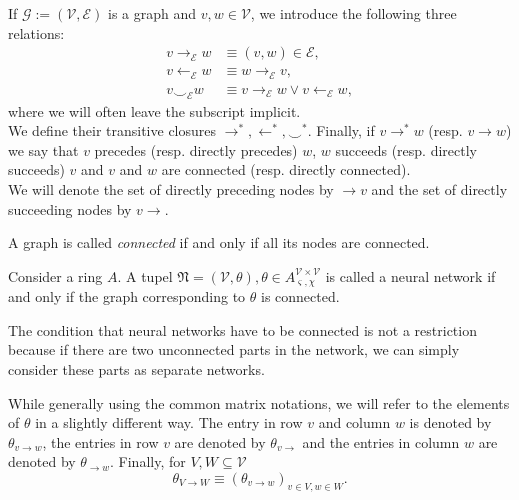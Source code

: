 \documentclass[a4paper,11pt]{report}
\newcommand{\const}{\varsigma} %
\newcommand{\var}{\chi} %
\newcommand{\conn}{\smile} %
\begin{document}
\begin{Def}
If $\mathcal{G}:=(\mathcal{V},\mathcal{E})$ is a graph and $v,w\in\mathcal{V}$, we introduce the following three relations:
\begin{align}
v\to_{\mathcal{E}} w&\equiv (v,w)\in\mathcal{E},\\
v\leftarrow_{\mathcal{E}} w &\equiv w\to_{\mathcal{E}} v,\\
v\conn_{\mathcal{E}} w &\equiv v\to_{\mathcal{E}} w\vee v\leftarrow_{\mathcal{E}} w,
\end{align}
where we will often leave the subscript implicit.\\
We define their transitive closures $\to^*,\leftarrow^*,\conn^*$. Finally, if $v\to^* w$ (resp. $v\to w$) we say that $v$ precedes (resp. directly precedes) $w$, $w$ succeeds (resp. directly succeeds) $v$ and $v$ and $w$ are connected (resp. directly connected).\\
We will denote the set of directly preceding nodes by $\to v$ and the set of directly succeeding nodes by $v\to$.
\end{Def}

\begin{Def}
A graph is called \emph{connected} if and only if all its nodes are connected.
\end{Def}

\begin{Def}
Consider a ring $A$. A tupel $\mathfrak{N}=(\mathcal{V},\theta), \theta\in A_{\const,\var}^{\mathcal{V}\times\mathcal{V}}$ is called a neural network if and only if the graph corresponding to $\theta$ is connected.
\end{Def}

\begin{Par}
The condition that neural networks have to be connected is not a restriction because if there are two unconnected parts in the network, we can simply consider these parts as separate networks.
\end{Par}

\begin{Not}
While generally using the common matrix notations, we will refer to the elements of $\theta$ in a slightly different way. The entry in row $v$ and column $w$ is denoted by $\theta_{v\to w}$, the entries in row $v$ are denoted by $\theta_{v\to}$ and the entries in column $w$ are denoted by $\theta_{\to w}$. Finally, for $V,W\subseteq\mathcal{V}$
\[
\theta_{V\to W}\equiv\left(\theta_{v\to w}\right)_{v\in V,w\in W}.
\]
\end{Not}
\end{document}
